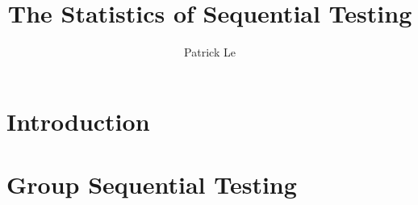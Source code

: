 \documentclass[final,3p,times]{elsarticle}
\begin{document}
\begin{frontmatter}



\title{The Statistics of Sequential Testing}


\author{Patrick Le}

\address{}

\begin{abstract}

\end{abstract}

\begin{keyword}


\end{keyword}

\end{frontmatter}



\section{Introduction}


\section{Group Sequential Testing}
\end{document}
